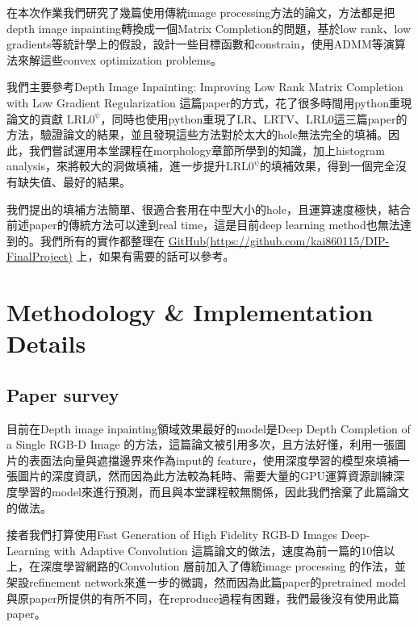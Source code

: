 \documentclass{article}
\begin{document}
\begin{CJK*}{UTF8}{bkai}
在本次作業我們研究了幾篇使用傳統image processing方法的論文，方法都是把depth image inpainting轉換成一個Matrix Completion的問題，基於low rank、low gradients等統計學上的假設，設計一些目標函數和constrain，使用ADMM等演算法來解這些convex optimization problems。


我們主要參考Depth Image Inpainting:
Improving Low Rank Matrix Completion with
Low Gradient Regularization \cite{lrl0phi}這篇paper的方式，花了很多時間用python重現論文的貢獻 {$\mathrm{LRL0^{\psi}}$}，同時也使用python重現了LR\cite{LR}、LRTV\cite{LRTV}、LRL0\cite{LRl0}這三篇paper的方法，驗證論文的結果，並且發現這些方法對於太大的hole無法完全的填補。因此，我們嘗試運用本堂課程在morphology章節所學到的知識，加上histogram analysis，來將較大的洞做填補，進一步提升$\mathrm{LRL0^{\psi}}$的填補效果，得到一個完全沒有缺失值、最好的結果。


我們提出的填補方法簡單、很適合套用在中型大小的hole，且運算速度極快，結合前述paper的傳統方法可以達到real time，這是目前deep learning method也無法達到的。我們所有的實作都整理在 \href{https://github.com/kai860115/DIP-FinalProject}{GitHub(https://github.com/kai860115/DIP-FinalProject)} 上，如果有需要的話可以參考。


\section{Methodology \& Implementation Details}

\subsection{Paper survey}
目前在Depth image inpainting領域效果最好的model是Deep Depth Completion of a Single RGB-D Image \cite{singledepth}的方法，這篇論文被引用多次，且方法好懂，利用一張圖片的表面法向量與遮擋邊界來作為input的 feature，使用深度學習的模型來填補一張圖片的深度資訊，然而因為此方法較為耗時、需要大量的GPU運算資源訓練深度學習的model來進行預測，而且與本堂課程較無關係，因此我們捨棄了此篇論文的做法。

接者我們打算使用Fast Generation of High Fidelity RGB-D Images 
Deep-Learning with Adaptive Convolution \cite{fast}這篇論文的做法，速度為前一篇的10倍以上，在深度學習網路的Convolution 層前加入了傳統image processing 的作法，並架設refinement network來進一步的微調，然而因為此篇paper的pretrained model 與原paper所提供的有所不同，在reproduce過程有困難，我們最後沒有使用此篇paper。


\end{CJK*}
\end{document}
